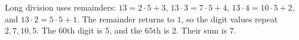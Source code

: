 Long division uses remainders: $13=2\cdot5+3$, $13\cdot3=7\cdot5+4$, $13\cdot4=10\cdot5+2$, and $13\cdot2=5\cdot5+1$. The remainder returns to $1$, so the digit values repeat $2,7,10,5$. The $60$th digit is $5$, and the $65$th is $2$. Their sum is $\boxed7$.
